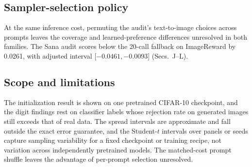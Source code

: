 \subsection{Sampler-selection policy}
\label{supp:boundary-policy}
At the same inference cost, permuting the audit's text-to-image choices
across prompts leaves the coverage and learned-preference differences
unresolved in both families. The Sana audit scores below the 20-call
fallback on ImageReward by 0.0261, with adjusted interval
[$-0.0461,-0.0093$] (Secs.~J--L).

\subsection{Scope and limitations}
\label{supp:boundary-limits}
The initialization result is shown on one pretrained CIFAR-10 checkpoint,
and the digit findings rest on classifier labels whose rejection rate on
generated images still exceeds that of real data. The spread intervals
are approximate and fall outside the exact error guarantee, and the
Student-$t$ intervals over panels or seeds capture sampling variability
for a fixed checkpoint or training recipe, not variation across
independently pretrained models. The matched-cost prompt shuffle leaves
the advantage of per-prompt selection unresolved.
